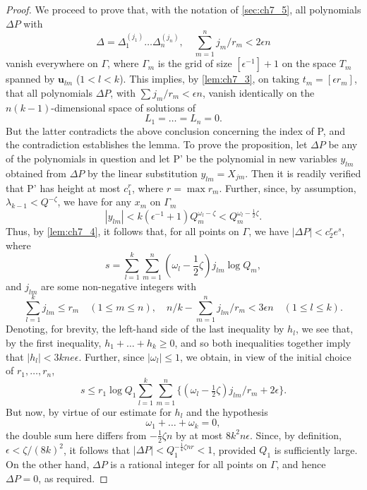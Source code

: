 \begin{proof}
We proceed to prove that, with the notation of \autoref{sec:ch7_5}, all polynomials $\Delta P$ with
\[\Delta = \Delta_1^{(j_1)} \dots \Delta_n^{(j_n)}, \quad \sum_{m=1}^n j_m/r_m < 2\epsilon n\]
vanish everywhere on $\Gamma$, where $\Gamma_m$ is the grid of size $[\epsilon^{-1}] + 1$ on the space $T_m$ spanned by $\mathbf{u}_{lm}$ ($1 < l < k$). This implies, by \autoref{lem:ch7_3}, on taking $t_m = [\epsilon r_m]$, that all polynomials $\Delta P$, with $\sum j_m/r_m < \epsilon n$, vanish identically on the $n(k-1)$-dimensional space of solutions of
\[L_1 = \dots = L_n = 0.\]
But the latter contradicts the above conclusion concerning the index of P, and the contradiction establishes the lemma. To prove the proposition, let $\Delta P$ be any of the polynomials in question and let P' be the polynomial in new variables $y_{lm}$ obtained from $\Delta P$ by the linear substitution $y_{lm} = X_{jm}$. Then it is readily verified that P' has height at most $c_1^r$, where $r = \max r_m$. Further, since, by assumption, $\lambda_{k-1} < Q^{-\zeta}$, we have for any $x_m$ on $\Gamma_m$
\[|y_{lm}| < k(\epsilon^{-1}+1) Q_m^{\omega_l-\zeta} < Q_m^{\omega_l-\frac{1}{2}\zeta}.\]
Thus, by \autoref{lem:ch7_4}, it follows that, for all points on $\Gamma$, we have $|\Delta P| < c_2^r e^s$, where
\[s = \sum_{l=1}^{k} \sum_{m=1}^{n} (\omega_{l} - \frac{1}{2}\zeta) j_{lm} \log Q_{m},\]
and $j_{lm}$ are some non-negative integers with
\[\sum_{l=1}^{k} j_{lm} \leqslant r_{m} \quad (1 \leqslant m \leqslant n), \quad n/k - \sum_{m=1}^{n} j_{lm}/r_{m} < 3\epsilon n \quad (1 \leqslant l \leqslant k).\]
Denoting, for brevity, the left-hand side of the last inequality by  $h_l$, we see that, by the first inequality,  $h_1 + \ldots + h_k \ge 0$, and so both inequalities together imply that  $|h_l| < 3kne\epsilon$. Further, since  $|\omega_l| \le 1$, we obtain, in view of the initial choice of  $r_1, \ldots, r_n$,
\[s\leqslant r_1\log Q_1\sum_{l=1}^k\sum_{m=1}^n\{(\omega_l-\tfrac12\zeta)j_{lm}/r_m+2\epsilon\}.\]
But now, by virtue of our estimate for  $h_l$  and the hypothesis
\[\omega_1 + \ldots + \omega_k = 0,\]
the double sum here differs from  $-\frac{1}{2}\zeta n$  by at most  $8k^2n\epsilon$. Since, by definition,  $\epsilon < \zeta/(8k)^2$, it follows that  $|\Delta P| < Q_1^{-\frac{1}{4}\zeta nr} < 1$, provided  $Q_1$  is sufficiently large. On the other hand,  $\Delta P$  is a rational integer for all points on  $\Gamma$, and hence  $\Delta P = 0$, as required.


\end{proof}
